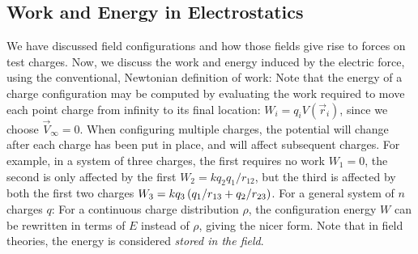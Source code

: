 \subsection{Work and Energy in Electrostatics}
We have discussed field configurations and how those fields give rise to forces on test charges. Now, we discuss the work and energy induced by the electric force, using the conventional, Newtonian definition of work:
Note that the energy of a charge configuration may be computed by evaluating the work required to move each point charge from infinity to its final location: $W_i = q_i V(\vec{r}_i)$, since we choose $\vec{V}_{\infty}=0$.
When configuring multiple charges, the potential will change after each charge has been put in place, and will affect subsequent charges. For example, in a system of three charges, the first requires no work $W_1=0$, the second is only affected by the first $W_2 = k q_2 q_1 / r_{12}$, but the third is affected by both the first two charges $W_3 = k q_3 \left(q_1 / r_{13} + q_2 / r_{23}\right)$. 
For a general system of $n$ charges $q$:
For a continuous charge distribution $\rho$, the configuration energy $W$ can be rewritten in terms of $E$ instead of $\rho$, giving the nicer form. Note that in field theories, the energy is considered \textit{stored in the field}.
